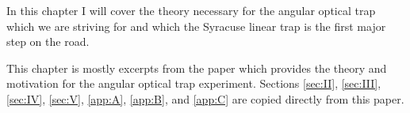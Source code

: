 \acresetall

In this chapter I will cover the theory necessary for the angular optical trap
which we are striving for and which the Syracuse linear trap is the first major
step on the road.

This chapter is mostly excerpts from the paper which provides the theory and
motivation for the angular optical trap experiment.\cite{Perreca:2014}
Sections \ref{sec:II}, \ref{sec:III}, \ref{sec:IV}, \ref{sec:V}, \ref{app:A},
\ref{app:B}, and \ref{app:C} are copied directly from this paper.











